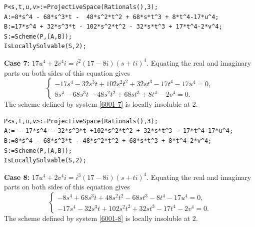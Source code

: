 \documentclass[a4paper,12pt,english,reqno]{amsart}
\begin{document}
\begin{lstlisting}
P<s,t,u,v>:=ProjectiveSpace(Rationals(),3);
A:=8*s^4 - 68*s^3*t -  48*s^2*t^2 + 68*s*t^3 + 8*t^4-17*u^4;
B:=17*s^4 + 32*s^3*t - 102*s^2*t^2 - 32*s*t^3 + 17*t^4-2*v^4;
S:=Scheme(P,[A,B]);
IsLocallySolvable(S,2);
\end{lstlisting}

{\bf Case 7:} $17u^4+2v^4i=i^2(17-8i)(s+ti)^4$. Equating the real and imaginary parts on both sides of this equation gives
\begin{equation}\label{6001-7}
\begin{cases}
-17s^4 - 32s^3t + 102s^2t^2 + 32st^3 - 17t^4 - 17u^4=0,\\
8s^4 - 68s^3t - 48s^2t^2 + 68st^3 + 8t^4 - 2v^4=0.
\end{cases}
\end{equation}
The scheme defined by system \eqref{6001-7} is locally insoluble at $2$.

\begin{lstlisting}
P<s,t,u,v>:=ProjectiveSpace(Rationals(),3);
A:= - 17*s^4 - 32*s^3*t +102*s^2*t^2 + 32*s*t^3 - 17*t^4-17*u^4;
B:=8*s^4 - 68*s^3*t - 48*s^2*t^2 + 68*s*t^3 + 8*t^4-2*v^4;
S:=Scheme(P,[A,B]);
IsLocallySolvable(S,2);
\end{lstlisting}

{\bf Case 8:} $17u^4+2v^4i=i^3(17-8i)(s+ti)^4$. Equating the real and imaginary parts on both sides of this equation gives
\begin{equation}\label{6001-8}
\begin{cases}
-8s^4 + 68s^3t + 48s^2t^2 - 68st^3 - 8t^4 - 17u^4=0,\\
-17s^4 - 32s^3t + 102s^2t^2 + 32st^3 - 17t^4 - 2v^4=0.
\end{cases}
\end{equation}
The scheme defined by system \eqref{6001-8} is locally insoluble at $2$.
\end{document}
